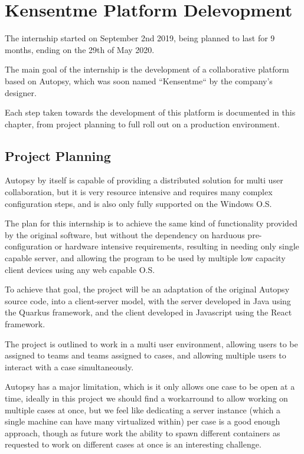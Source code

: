 
\chapter{Kensentme Platform Delevopment}
\label{ch:development}

The internship started on September 2nd 2019, being planned to last for 9 months, ending on the 29th of May 2020.

The main goal of the internship is the development of a collaborative platform based on Autopsy, which was soon named ``Kensentme`` by the company's designer.

Each step taken towards the development of this platform is documented in this chapter, from project planning to full roll out on a production environment.

\section{Project Planning}

Autopsy by itself is capable of providing a distributed solution for multi user collaboration, but it is very resource intensive and requires many complex configuration steps,
and is also only fully supported on the Windows O.S.

The plan for this internship is to achieve the same kind of functionality provided by the original software, but without the dependency on harduous pre-configuration
or hardware intensive requirements, resulting in needing only single capable server, and allowing the program to be used by multiple low capacity client devices using 
any web capable O.S.

To achieve that goal, the project will be an adaptation of the original Autopsy source code, into a client-server model, with the server developed in Java using the Quarkus \cite{quarkus} framework,
and the client developed in Javascript using the React \cite{react} framework.

The project is outlined to work in a multi user environment, allowing users to be assigned to teams and teams assigned to cases, and allowing multiple users to interact with
a case simultaneously.

Autopsy has a major limitation, which is it only allows one case to be open at a time, ideally in this project we should find a workarround to allow working on multiple cases
at once, but we feel like dedicating a server instance (which a single machine can have many virtualized within) per case is a good enough approach, though as future work the
ability to spawn different containers as requested to work on different cases at once is an interesting challenge.

